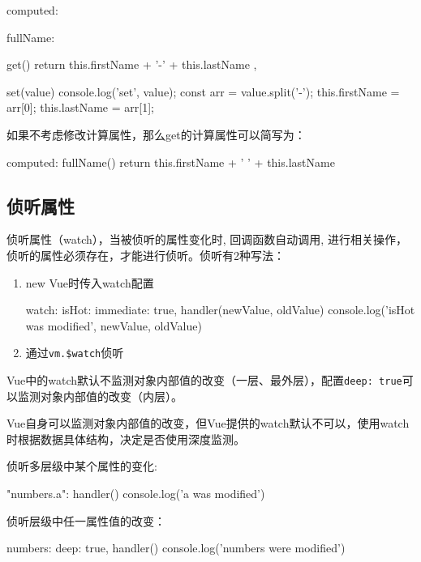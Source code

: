 \begin{js}
computed: {
    fullName: {
        get() {
            return this.firstName + '-' + this.lastName
        },

        set(value) {
            console.log('set', value);
            const arr = value.split('-');
            this.firstName = arr[0];
            this.lastName = arr[1];
        }
    }
}
\end{js}

如果不考虑修改计算属性，那么get的计算属性可以简写为：
\begin{js}
computed: {
    fullName() {
        return this.firstName + ' ' + this.lastName
    }
}
\end{js}
\subsection{侦听属性}
侦听属性（watch），当被侦听的属性变化时, 回调函数自动调用, 进行相关操作，侦听的属性必须存在，才能进行侦听。侦听有2种写法：
\begin{enumerate}
    \item new Vue时传入watch配置
    \begin{js}
watch: {
    isHot: {
        immediate: true,
        handler(newValue, oldValue) {
            console.log('isHot was modified', newValue, oldValue)
        }
    }
}
    \end{js}
    \item 通过\verb|vm.$watch|侦听
\end{enumerate}

Vue中的watch默认不监测对象内部值的改变（一层、最外层），配置\verb|deep: true|可以监测对象内部值的改变（内层）。

Vue自身可以监测对象内部值的改变，但Vue提供的watch默认不可以，使用watch时根据数据具体结构，决定是否使用深度监测。

侦听多层级中某个属性的变化:
\begin{js}
"numbers.a": {
    handler() {
        console.log('a was modified')
    }
}
\end{js}

侦听层级中任一属性值的改变：
\begin{js}
numbers: {
    deep: true,
    handler() {
        console.log('numbers were modified')
    }
}
\end{js}

